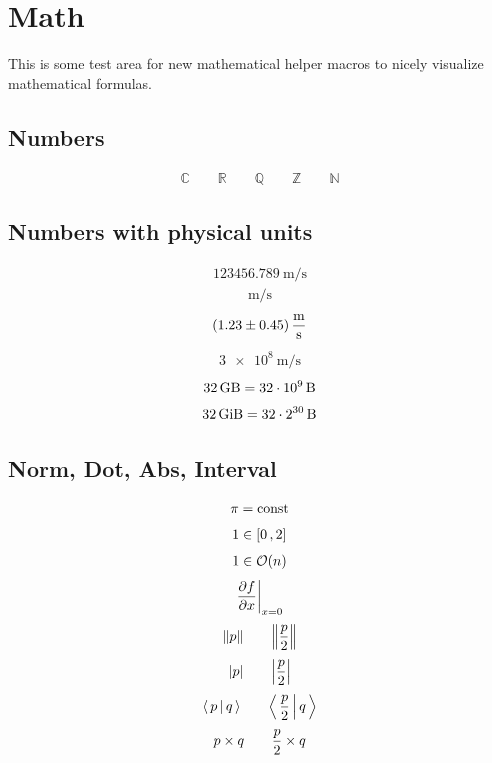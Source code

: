 
\chapter{Math}

This is some test area for new mathematical helper macros to nicely visualize mathematical formulas.

\section{Numbers}
\begin{align}
    \mathbb{C}
    \qquad
    \mathbb{R}
    \qquad
    \mathbb{Q}
    \qquad
    \mathbb{Z}
    \qquad
    \mathbb{N}
\end{align}

\section{Numbers with physical units}
\begin{align}
    \SI{123456.789}{\meter\per\second}
\end{align}
\begin{align}
    \si{\meter\per\second}
\end{align}
\begin{align}
    \SI{1.23\pm0.45}{\meter\per\second}
\end{align}
\begin{align}
    \SI{3e8}{\meter\per\second}
\end{align}
\begin{align}
    \SI{32}{\giga\byte} = \SI{32e9}{\byte}
\end{align}
\begin{align}
    \SI{32}{\gibi\byte} = \SI[exponent-base=2]{32e30}{\byte}
\end{align}

\section{Norm, Dot, Abs, Interval}
\begin{align}
    \pi = \mathrm{const}
\end{align}
\begin{align}
    1 \in [ 0 \,, 2 ]
\end{align}
\begin{align}
    1 \in \order{n}
\end{align}
\begin{align}
    \evalat{ \frac{\partial f}{\partial x} }{ x = 0 }
\end{align}
\begin{align}
    \norm{p} \qquad \norm{\frac{p}{2}}
\end{align}
\begin{align}
    \abs{p} \qquad \abs{\frac{p}{2}}
\end{align}
\begin{align}
    \dotproduct{p}{q} \qquad \dotproduct{\frac{p}{2}}{q}
\end{align}
\begin{align}
    p\times q \qquad \frac{p}{2}\times q
\end{align}

